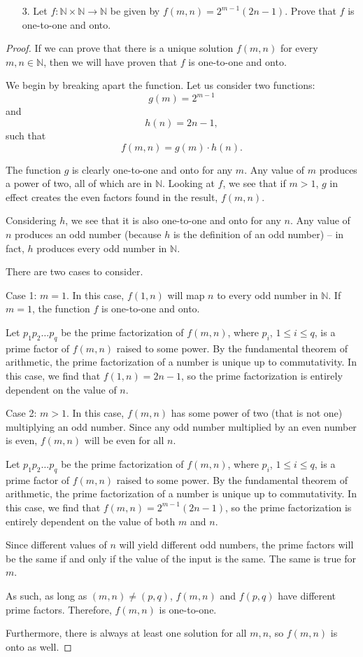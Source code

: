 \documentclass[10pt]{article}
\theoremstyle{definition}
\theoremstyle{plain}
\newcommand{\N}{\mathbb{N}}
\begin{document}
\pagebreak



\begin{enumerate}
\item[3.] Let $f: \N \times \N \to \N$ be given by $f(m,n) = 2^{m-1}(2n-1)$.  Prove that $f$ is one-to-one and onto.
\end{enumerate}



\begin{proof}
  If we can prove that there is a unique solution $f(m,n)$ for every $m,n\in\N$, then we will have proven that $f$ is one-to-one and onto.

  We begin by breaking apart the function. Let us consider two functions:
  $$g(m) = 2^{m-1}$$
  and
  $$h(n) = 2n-1,$$
  such that
  $$f(m,n) = g(m)\cdot h(n).$$

  The function $g$ is clearly one-to-one and onto for any $m$. Any value of $m$ produces a power of two, all of which are in $\N$. Looking at $f$, we see that if $m>1$, $g$ in effect creates the even factors found in the result, $f(m,n)$.

  Considering $h$, we see that it is also one-to-one and onto for any $n$. Any value of $n$ produces an odd number (because $h$ is the definition of an odd number) -- in fact, $h$ produces every odd number in $\N$.

  There are two cases to consider.

  Case 1: $m=1$. In this case, $f(1,n)$ will map $n$ to every odd number in $\N$. If $m=1$, the function $f$ is one-to-one and onto.

  Let $p_1 p_2 \dots p_q$ be the prime factorization of $f(m,n)$, where $p_i$, $1\leq i \leq q$, is a prime factor of $f(m,n)$ raised to some power. By the fundamental theorem of arithmetic, the prime factorization of a number is unique up to commutativity. In this case, we find that $f(1,n) = 2n-1$, so the prime factorization is entirely dependent on the value of $n$.

  Case 2: $m>1$. In this case, $f(m,n)$ has some power of two (that is not one) multiplying an odd number. Since any odd number multiplied by an even number is even, $f(m,n)$ will be even for all $n$.

  Let $p_1 p_2 \dots p_q$ be the prime factorization of $f(m,n)$, where $p_i$, $1\leq i \leq q$, is a prime factor of $f(m,n)$ raised to some power. By the fundamental theorem of arithmetic, the prime factorization of a number is unique up to commutativity. In this case, we find that $f(m,n) = 2^{m-1}(2n-1)$, so the prime factorization is entirely dependent on the value of both $m$ and $n$.

  Since different values of $n$ will yield different odd numbers, the prime factors will be the same if and only if the value of the input is the same. The same is true for $m$.

  As such, as long as $(m,n)\neq(p,q)$, $f(m,n)$ and $f(p,q)$ have different prime factors. Therefore, $f(m,n)$ is one-to-one.

  Furthermore, there is always at least one solution for all $m,n$, so $f(m,n)$ is onto as well.
\end{proof}
\end{document}
